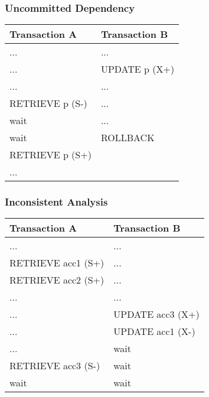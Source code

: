 \documentclass[dvipsnames]{beamer}
\theoremstyle{plain}
\begin{document}
\begin{frame}[fragile]
  \frametitle{Uncommitted Dependency}

  \begin{example}
    \begin{table}
      \begin{tabular}{ll}
Transaction A   & Transaction B\\\hline
...             & ...          \\\pause
...             & UPDATE p (X+)\\\pause
...             & ...          \\
RETRIEVE p (S-) & ...          \\
wait            & ...          \\\pause
wait            & ROLLBACK     \\
RETRIEVE p (S+) &              \\
...             &
      \end{tabular}
    \end{table}
  \end{example}
\end{frame}

\begin{frame}[fragile]
  \frametitle{Inconsistent Analysis}

  \begin{example}[sum of accounts: acc1=40, acc2=50, acc3=30]
    \begin{table}
      \begin{tabular}{ll}
Transaction A        & Transaction B   \\\hline
...                  & ...             \\\pause
RETRIEVE acc1 (S+)   & ...             \\\pause
RETRIEVE acc2 (S+)   & ...             \\\pause
...                  & ...             \\
...                  & UPDATE acc3 (X+)\\\pause
...                  & UPDATE acc1 (X-)\\
...                  & wait            \\\pause
RETRIEVE acc3 (S-)   & wait            \\
wait                 & wait
      \end{tabular}
    \end{table}
  \end{example}
\end{frame}
\end{document}
